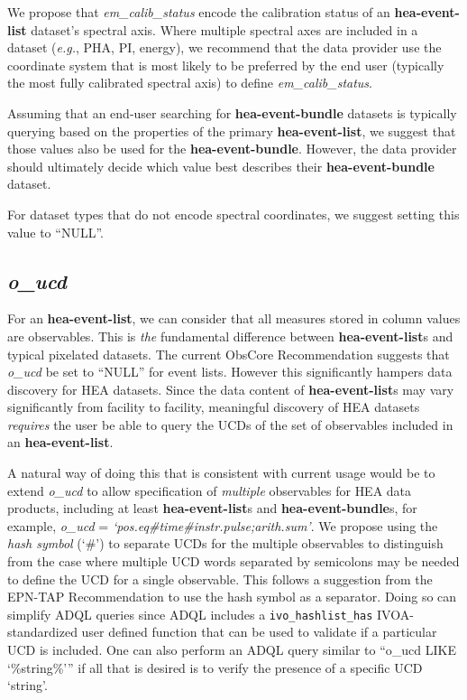 \documentclass[11pt,a4paper]{ivoa}
\begin{document}
We propose that {\em em\_calib\_status\/} encode the calibration status of an {\bf hea-event-list} dataset's spectral axis.  Where multiple spectral axes are included in a dataset ({\em e.g.\/}, PHA, PI, energy), we recommend that the data provider use the coordinate system that is most likely to be preferred by the end user (typically the most fully calibrated spectral axis) to define {\em em\_calib\_status\/}.

Assuming that an end-user searching for {\bf hea-event-bundle} datasets is typically querying based on the properties of the primary {\bf hea-event-list}, we suggest that those values also be used for the {\bf hea-event-bundle}.  However, the data provider should ultimately decide which value best describes their {\bf hea-event-bundle} dataset.

For dataset types that do not encode spectral coordinates, we suggest setting this value to ``NULL''.

\subsection{{\em o\_ucd}}

For an {\bf hea-event-list}, we can consider that all measures stored in column values are observables. This is {\em the\/} fundamental difference between {\bf hea-event-list}s and typical pixelated datasets. The current ObsCore Recommendation suggests that {\em o\_ucd\/} be set to ``NULL'' for event lists. However this significantly hampers data discovery for \gls{HEA} datasets. Since the data content of {\bf hea-event-list}s may vary significantly from facility to facility, meaningful discovery of \gls{HEA} datasets {\em requires\/} the user be able to query the UCDs of the set of observables included in an {\bf hea-event-list}.

A natural way of doing this that is consistent with current usage would be to extend {\em o\_ucd\/} to allow specification of {\em multiple\/} observables for \gls{HEA} data products, including at least {\bf hea-event-list}s and {\bf hea-event-bundle}s, for example, {\em o\_ucd\/} =  {\em `pos.eq\#time\#instr.pulse;arith.sum'\/}.  We propose using the {\em hash symbol\/} (`\#') to separate UCDs for the multiple observables to distinguish from the case where multiple UCD words separated by semicolons may be needed to define the UCD for a single observable.  This follows a suggestion from the EPN-TAP Recommendation \citep{2022ivoa.spec.0822E} to use the hash symbol as a separator. Doing so can simplify ADQL queries since ADQL includes a {\tt ivo\_hashlist\_has} IVOA-standardized user defined function that can be used to validate if a particular UCD is included.  One can also perform an ADQL query similar to ``o\_ucd LIKE `\%string\%'\null'' if all that is desired is to verify the presence of a specific UCD `string'.
\end{document}
